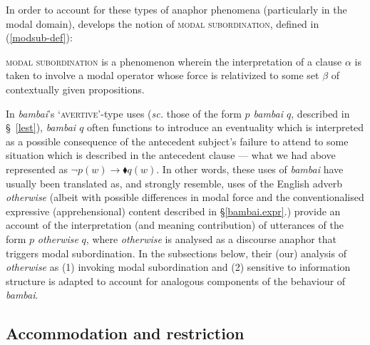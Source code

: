 In order to account for these types of anaphor phenomena (particularly in the modal domain), \citet{Roberts1989,Roberts1990,Roberts2020} develops the notion of \textsc{modal subordination}, defined in (\ref{modsub-def}):

\pex\label{modsub-def}\textsc{modal subordination} is a phenomenon wherein the interpretation of a clause $ \alpha $ is taken to involve a modal operator whose force is relativized to some set $ \beta $ of contextually given propositions.\hfill\citep[718]{Roberts1989}


\xe







In \textit{bambai}'s `\textsc{avertive'}-type uses (\textit{sc.} those of the form \textit{$ p $ bambai $ q $}, described in \S~\ref{lest}), \textit{bambai $ q $} often functions to introduce an eventuality which is interpreted as a possible consequence of the antecedent subject's failure to attend to some situation which is described in the antecedent clause --- what we had above represented as $ \neg p(w)\to\blacklozenge q(w)$. In other words, these uses of \textit{bambai} have usually been translated as, and strongly resemble, uses of the English adverb \textit{otherwise} (albeit with possible differences in modal force and the conventionalised expressive (apprehensional) content described in \S \ref{bambai.expr}.) \citet{PhilKotek} provide an account of the interpretation (and meaning contribution) of utterances of the form $ p  $ \textit{otherwise} $ q $, where \textit{otherwise} is analysed as a discourse anaphor that triggers modal subordination. In the subsections below, their (our) analysis of \textit{otherwise} as (1) invoking modal subordination and (2) sensitive to information structure is adapted to account for analogous components of the behaviour of \textit{bambai}.


\subsection{Accommodation and restriction}\label{modsub}

